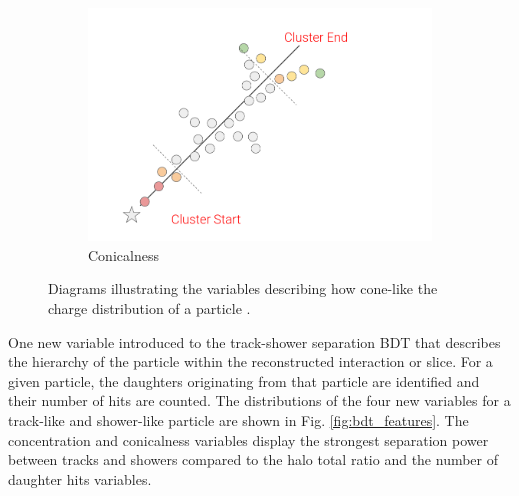 \begin{figure}[htbp!]
\begin{subfigure}[b]{0.329\textwidth}
            \includegraphics[width=\textwidth]{Conicalness}
            \caption{Conicalness}%
            \label{fig:conicalness}
        \end{subfigure}
        \caption[cone_variables]{
	Diagrams illustrating the variables describing how cone-like the charge distribution of a particle .
	}
        \label{fig:cone_variables}
\end{figure}

One new variable introduced to the track-shower separation BDT that describes the hierarchy of the particle within the reconstructed interaction or slice.
For a given particle, the daughters originating from that particle are identified and their number of hits are counted.
The distributions of the four new variables for a track-like and shower-like particle are shown in Fig. \ref{fig:bdt_features}.
The concentration and conicalness variables display the strongest separation power between tracks and showers compared to the halo total ratio and the number of daughter hits variables.

